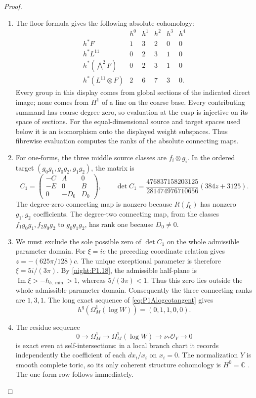 \documentclass[11pt,a4paper]{article}
\numberwithin{equation}{section}
\theoremstyle{definition}
\begin{document}
\begin{proof}
\begin{enumerate}[label=\arabic*.]
\item The floor formula gives the following absolute cohomology:
\[
\begin{array}{c|ccccc}
&h^0&h^1&h^2&h^3&h^4\\\hline
h^*F&1&3&2&0&0\\
h^*L^{11}&0&2&3&1&0\\
h^*(\bigwedge^2F)&0&2&3&1&0\\
h^*(L^{11}\otimes F)&2&6&7&3&0.
\end{array}
\]
Every group in this display comes from global sections of the
indicated direct image; none comes from $H^1$ of a line on the
coarse base. Every contributing summand has coarse degree zero,
so evaluation at the cusp is injective on its space of sections.
For the equal-dimensional source and target spaces used below
it is an isomorphism onto the displayed weight subspaces.
Thus fibrewise evaluation computes the ranks of the
absolute connecting maps.

\item For one-forms, the three middle source classes are $f_i\otimes g_i$.
In the ordered target $(g_0g_1,g_0g_2,g_1g_2)$, the matrix is
\[
C_1=\begin{pmatrix}-C&A&0\\-E&0&B\\0&-D_0&D_0\end{pmatrix},
\qquad
\det C_1=
\frac{476837158203125}{281474976710656}(384z+3125).
\]
The degree-zero connecting map is nonzero because $R(f_0)$
has nonzero $g_1,g_2$ coefficients. The degree-two connecting
map, from the classes $f_1g_0g_1,f_2g_0g_2$ to $g_0g_1g_2$,
has rank one because $D_0\ne0$.

\item We must exclude the sole possible zero of $\det C_1$ on the
whole admissible parameter domain. For $\xi=ic$ the preceding
coordinate relation gives $z=-(625\pi/128)c$.
The unique exceptional parameter is therefore
$\xi=5i/(3\pi)$. By \cref{night:P1.18}, the admissible half-plane is
$\operatorname{Im}\xi>-h_{b,\min}>1$, whereas $5/(3\pi)<1$.
Thus this zero lies outside the whole admissible parameter domain.
Consequently the three connecting ranks are $1,3,1$.
The long exact sequence of \eqref{eq:P1Alogcotangent} gives
\[
h^q(\Omega_M^1(\log W))=(0,1,1,0,0).
\]

\item The residue sequence
\[
0\to\Omega_M^1\to\Omega_M^1(\log W)\to\nu_*\mathcal O_Y\to0
\]
is exact even at self-intersections: in a local branch chart it
records independently the coefficient of each $dx_i/x_i$ on
$x_i=0$. The normalization $Y$ is smooth complete toric, so its
only coherent structure cohomology is $H^0=\mathbb C$ \cite[Theorem 9.2.3, p.~410]{CoxLittleSchenck2011}.
The one-form row follows immediately.


\end{enumerate}
\end{proof}
\end{document}
